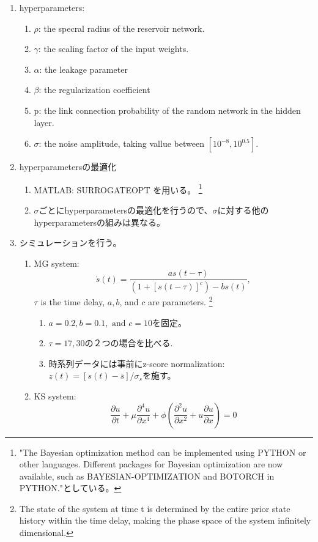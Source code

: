 \begin{enumerate}
  \item hyperparameters:\begin{enumerate}
    \item $\rho$: the specral radius of the  reservoir network.
    \item $\gamma$: the scaling factor of the input weights.
    \item $\alpha$: the leakage parameter 
    \item $\beta$: the regularization coefficient 
    \item p: the link connection probability of the random network in the hidden layer.
    \item $\sigma$: the noise amplitude, taking vallue between $[10^{-8}, 10^{0.5}]$.
  \end{enumerate}
  \item hyperparametersの最適化\begin{enumerate}
    \item MATLAB: SURROGATEOPT を用いる。
      \footnote{"The Bayesian
      optimization method can be implemented using PYTHON or
      other languages. Different packages for Bayesian optimization are now available, such as BAYESIAN-OPTIMIZATION and
      BOTORCH in PYTHON."としている。}
    \item $\sigma$ごとにhyperparametersの最適化を行うので、$\sigma$に対する他のhyperparametersの組みは異なる。
  \end{enumerate}
  \item シミュレーションを行う。
  \begin{enumerate}
    \item MG system: 
    $$\dot{s}(t)=\frac{a s(t-\tau)}{\left(1+[s(t-\tau)]^c\right)-b s(t)},$$ $\tau$ is the time delay, $a, b$, and $c$ are parameters.
    \footnote{The state of the system at time t is determined by the entire prior state history
    within the time delay, making the phase space of the system
    infinitely dimensional.}  
    \begin{enumerate}
      \item $a=0.2, b=0.1, \text { and } c=10$を固定。
      \item $\tau=17, 30$の２つの場合を比べる.
      \item 時系列データには事前にz-score normalization: $z(t)=[s(t)-\bar{s}] / \sigma_s$を施す。
    \end{enumerate}
    \item KS system: 
    $$\frac{\partial u}{\partial t}+\mu \frac{\partial^4 u}{\partial x^4}+\phi\left(\frac{\partial^2 u}{\partial x^2}+u \frac{\partial u}{\partial x}\right)=0$$

\end{enumerate}
\end{enumerate}
